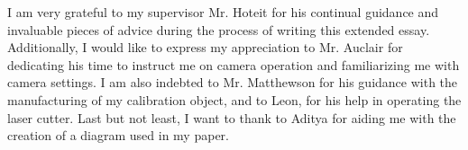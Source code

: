 \documentclass[12pt, oneside]{article}
\begin{document}
I am very grateful to my supervisor Mr. Hoteit for his continual guidance and invaluable pieces of advice during the process of writing this extended essay. Additionally, I would like to express my appreciation to Mr. Auclair for dedicating his time to instruct me on camera operation and familiarizing me with camera settings. I am also indebted to Mr. Matthewson for his guidance with the manufacturing of my calibration object, and to Leon, for his help in operating the laser cutter. Last but not least, I want to thank to Aditya for aiding me with the creation of a diagram used in my paper.
\clearpage
\pagestyle{backmatter}

\printbibliography[heading=bibintoc]{}


\clearpage
\begin{appendices}
    \pagestyle{appendices}
    
    
    
\end{appendices}
\end{document}
